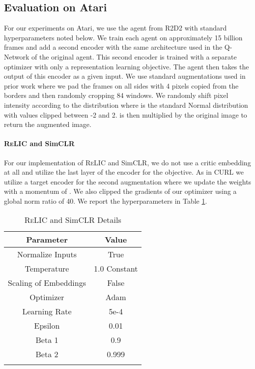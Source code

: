 \documentclass{article}
\newcommand{\relic}{\textsc{ReLIC}}
\begin{document}
\subsection{Evaluation on Atari} \label{sec:atari_app}
For our experiments on Atari, we use the agent from R2D2 \citep{kapturowski2019} with standard hyperparameters noted below. We train each agent on approximately 15 billion frames and add a second encoder with the same architecture used in the Q-Network of the original agent. This second encoder is trained with a separate optimizer with only a representation learning objective. The agent then takes the output of this encoder as a given input. We use standard augmentations used in prior work \citep{kostrikov2020image} where we pad the frames on all sides with 4 pixels copied from the borders and then randomly cropping 84 windows. We randomly shift pixel intensity according to the distribution  where  is the standard Normal distribution with values clipped between -2 and 2.  is then multiplied by the original image to return the augmented image.

\paragraph{\relic{} and SimCLR}
For our implementation of \relic{} and SimCLR, we do not use a critic embedding at all and utilize the last layer of the encoder for the objective. As in CURL \citep{srinivas2020curl} we utilize a target encoder for the second augmentation where we update the weights with a momentum of . We also clipped the gradients of our optimizer using a global norm ratio of 40. We report the hyperparameters in Table \ref{relic_atari}.


\begin{table}[ht]
  \caption{\relic{} and SimCLR Details}
  \centering
   \vspace{0.2cm}
  \begin{tabular}{cc}
    \toprule
    Parameter     & Value \\
    \midrule
    Normalize Inputs & True \\
    Temperature & 1.0 Constant \\
    Scaling of Embeddings & False \\
    Optimizer & Adam \\
    Learning Rate & 5e-4 \\
    Epsilon & 0.01 \\
    Beta 1 & 0.9 \\
    Beta 2 & 0.999 \\
    \bottomrule
    \label{relic_atari}
  \end{tabular}
\end{table}
\end{document}
